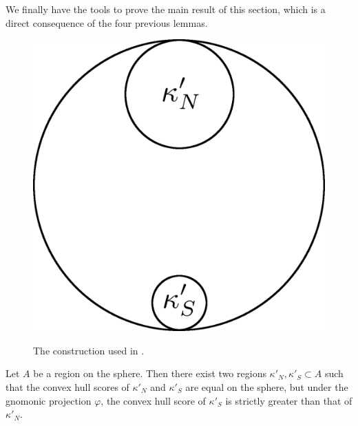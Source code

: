 We finally have the tools to prove the main result of this section,
which is a direct consequence of the four previous lemmas.

\begin{figure}
	\centering
	\includegraphics[width=.4\textwidth]{figs/differentkappa}\\[1.5em]
	\caption{ The construction used in . }
	\label{fig:caphr}
\end{figure}

\begin{theorem}
	\label{thm:convhull}
	Let $A$ be a region on the sphere.  Then there exist two regions $\kappa'_N,\kappa'_S\subset A$ such that the convex hull scores of $\kappa'_N$ and $\kappa'_S$ are equal on the sphere, but under the gnomonic projection $\varphi$, the convex hull score of $\kappa'_S$ is strictly greater than that of $\kappa'_N$. 
\end{theorem}

